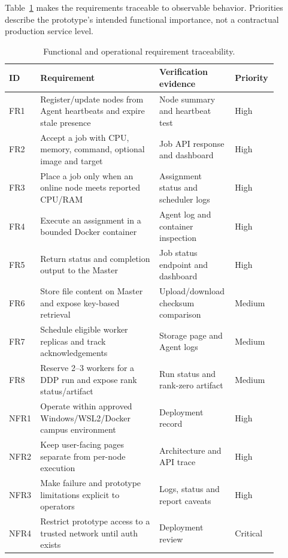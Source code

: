 \documentclass{article}
\begin{document}
Table~\ref{tab:requirements} makes the requirements traceable to observable behavior. Priorities describe the prototype's intended functional importance, not a contractual production service level.
\begin{table}[h!]
\centering
\caption{Functional and operational requirement traceability.}
\label{tab:requirements}
\begin{tabular}{|p{0.1\linewidth}|p{0.43\linewidth}|p{0.24\linewidth}|p{0.12\linewidth}|}
\hline
ID & Requirement & Verification evidence & Priority \\
\hline
FR1 & Register/update nodes from Agent heartbeats and expire stale presence & Node summary and heartbeat test & High \\
\hline
FR2 & Accept a job with CPU, memory, command, optional image and target & Job API response and dashboard & High \\
\hline
FR3 & Place a job only when an online node meets reported CPU/RAM & Assignment status and scheduler logs & High \\
\hline
FR4 & Execute an assignment in a bounded Docker container & Agent log and container inspection & High \\
\hline
FR5 & Return status and completion output to the Master & Job status endpoint and dashboard & High \\
\hline
FR6 & Store file content on Master and expose key-based retrieval & Upload/download checksum comparison & Medium \\
\hline
FR7 & Schedule eligible worker replicas and track acknowledgements & Storage page and Agent logs & Medium \\
\hline
FR8 & Reserve 2--3 workers for a DDP run and expose rank status/artifact & Run status and rank-zero artifact & Medium \\
\hline
NFR1 & Operate within approved Windows/WSL2/Docker campus environment & Deployment record & High \\
\hline
NFR2 & Keep user-facing pages separate from per-node execution & Architecture and API trace & High \\
\hline
NFR3 & Make failure and prototype limitations explicit to operators & Logs, status and report caveats & High \\
\hline
NFR4 & Restrict prototype access to a trusted network until auth exists & Deployment review & Critical \\
\hline
\end{tabular}
\end{table}
\end{document}
